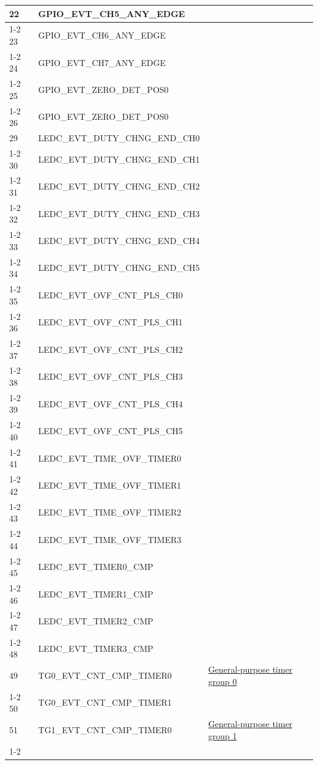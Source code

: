 \documentclass[main\_\_EN.tex]{subfiles}
\begin{document}
\begin{longtable}{ | l | l | l | }
22  & GPIO\_EVT\_CH5\_ANY\_EDGE &  \\ \cline{1-2}
23  & GPIO\_EVT\_CH6\_ANY\_EDGE &  \\ \cline{1-2}
24  & GPIO\_EVT\_CH7\_ANY\_EDGE &  \\ \cline{1-2}
25  & GPIO\_EVT\_ZERO\_DET\_POS0 &  \\ \cline{1-2}
26  & GPIO\_EVT\_ZERO\_DET\_POS0 &  \\ \hline
29  & LEDC\_EVT\_DUTY\_CHNG\_END\_CH0  & \nameref{mod:ledpwm}\\ \cline{1-2}
30  & LEDC\_EVT\_DUTY\_CHNG\_END\_CH1  & \\ \cline{1-2}
31  & LEDC\_EVT\_DUTY\_CHNG\_END\_CH2  & \\ \cline{1-2}
32  & LEDC\_EVT\_DUTY\_CHNG\_END\_CH3  & \\ \cline{1-2}
33  & LEDC\_EVT\_DUTY\_CHNG\_END\_CH4  & \\ \cline{1-2}
34  & LEDC\_EVT\_DUTY\_CHNG\_END\_CH5  & \\ \cline{1-2}
35  & LEDC\_EVT\_OVF\_CNT\_PLS\_CH0    & \\ \cline{1-2}
36  & LEDC\_EVT\_OVF\_CNT\_PLS\_CH1    & \\ \cline{1-2}
37  & LEDC\_EVT\_OVF\_CNT\_PLS\_CH2    & \\ \cline{1-2}
38  & LEDC\_EVT\_OVF\_CNT\_PLS\_CH3    & \\ \cline{1-2}
39  & LEDC\_EVT\_OVF\_CNT\_PLS\_CH4    & \\ \cline{1-2}
40  & LEDC\_EVT\_OVF\_CNT\_PLS\_CH5    & \\ \cline{1-2}
41  & LEDC\_EVT\_TIME\_OVF\_TIMER0     & \\ \cline{1-2}
42  & LEDC\_EVT\_TIME\_OVF\_TIMER1     & \\ \cline{1-2}
43  & LEDC\_EVT\_TIME\_OVF\_TIMER2     & \\ \cline{1-2}
44  & LEDC\_EVT\_TIME\_OVF\_TIMER3     & \\ \cline{1-2}
45  & LEDC\_EVT\_TIMER0\_CMP    & \\ \cline{1-2}
46  & LEDC\_EVT\_TIMER1\_CMP    & \\ \cline{1-2}
47  & LEDC\_EVT\_TIMER2\_CMP    & \\ \cline{1-2}
48  & LEDC\_EVT\_TIMER3\_CMP    & \\ \hline
49  & TG0\_EVT\_CNT\_CMP\_TIMER0    & \hyperref[mod:timg]{General-purpose timer group 0}   \\ \cline{1-2}
50  & TG0\_EVT\_CNT\_CMP\_TIMER1    & \\ \hline
51  & TG1\_EVT\_CNT\_CMP\_TIMER0    & \hyperref[mod:timg]{General-purpose timer group 1}   \\ \cline{1-2}

\end{longtable}
\end{document}
